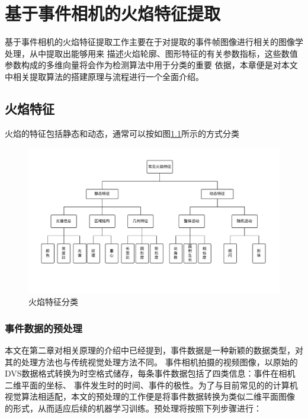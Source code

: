 
\chapter{基于事件相机的火焰特征提取}
基于事件相机的火焰特征提取工作主要在于对提取的事件帧图像进行相关的图像学处理，从中提取出能够用来
描述火焰轮廓、图形特征的有关参数指标，这些数值参数构成的多维向量将会作为检测算法中用于分类的重要
依据，本章便是对本文中相关提取算法的搭建原理与流程进行一个全面介绍。

\section{火焰特征}
火焰的特征包括静态和动态，通常可以按如图\ref{5}所示的方式分类
\begin{figure}
    \centering
    \includegraphics[width=\textwidth]{figures/extract_characteristic.pdf}
    \caption{火焰特征分类}
    \label{5}
\end{figure}

\subsection{事件数据的预处理}
本文在第二章对相关原理的介绍中已经提到，事件数据是一种新颖的数据类型，对其的处理方法也与传统视觉处理方法不同。
事件相机拍摄的视频图像，以原始的DVS数据格式转换为时空格式储存，每条事件数据包括了四类信息：事件在相机二维平面的坐标、
事件发生时的时间、事件的极性。为了与目前常见的的计算机视觉算法相适配，本文的预处理的工作便是将事件数据转换为类似二维平面图像
的形式，从而适应后续的机器学习训练。预处理将按照下列步骤进行：

